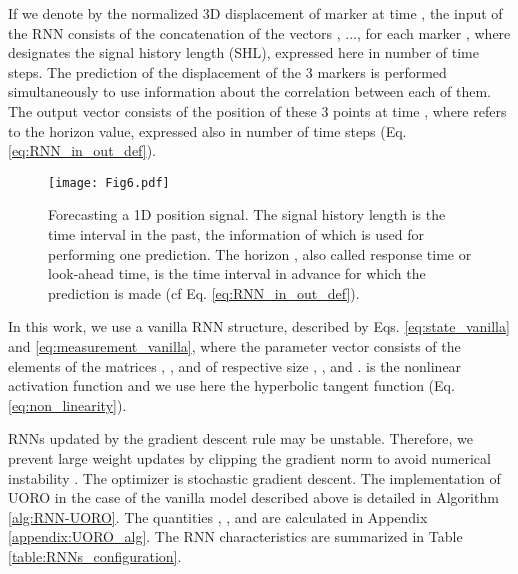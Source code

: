 \documentclass[twocolumn,a4paper]{svjour3} \sloppy          \smartqed
\begin{document}
If we denote by  the normalized 3D displacement of marker  at time , the input  of the RNN consists of the concatenation of the vectors , ...,  for each marker , where  designates the signal history length (SHL), expressed here in number of time steps. The prediction of the displacement of the 3 markers is performed simultaneously to use information about the correlation between each of them. The output vector  consists of the position of these 3 points at time , where  refers to the horizon value, expressed also in number of time steps (Eq. \ref{eq:RNN_in_out_def}).



\begin{figure} [thb!]
	\centering
\texttt{[image: Fig6.pdf]}
	\caption{Forecasting a 1D position signal. The signal history length  is the time interval in the past, the information of which is used for performing one prediction. The horizon , also called response time or look-ahead time, is the time interval in advance for which the prediction is made (cf Eq. \ref{eq:RNN_in_out_def}).}
\end{figure}

In this work, we use a vanilla RNN structure, described by Eqs. \ref{eq:state_vanilla} and \ref{eq:measurement_vanilla}, where the parameter vector  consists of the elements of the matrices , , and  of respective size , , and .  is the nonlinear activation function and we use here the hyperbolic tangent function (Eq. \ref{eq:non_linearity}). 








RNNs updated by the gradient descent rule may be unstable. Therefore, we prevent large weight updates by clipping the gradient norm to avoid numerical instability \cite{pascanu2013difficulty}. The optimizer is stochastic gradient descent. The implementation of UORO in the case of the vanilla model described above is detailed in Algorithm \ref{alg:RNN-UORO}. The quantities , , and  are calculated in Appendix \ref{appendix:UORO_alg}. The RNN characteristics are summarized in Table \ref{table:RNNs_configuration}.
\end{document}
